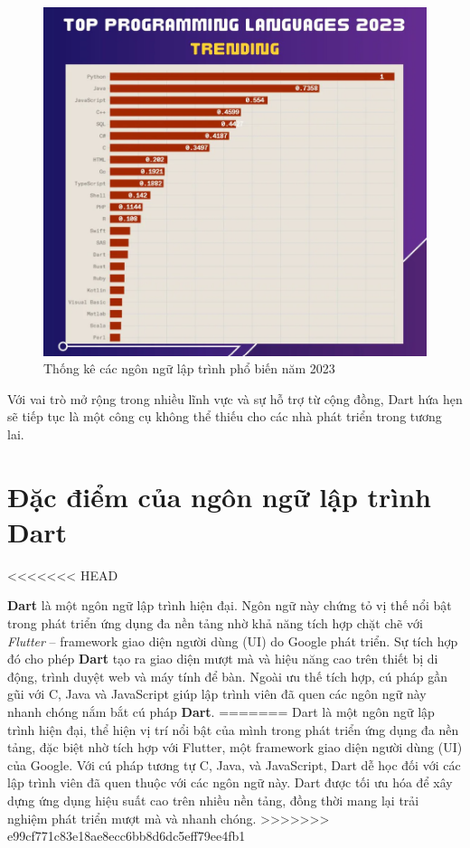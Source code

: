 \documentclass[../DoAn.tex]{subfiles}
\numberwithin{figure}{chapter}
\begin{document}
\begin{figure}[H]
    \centering
    \includegraphics[width=1\textwidth]{Hinhve/ranking.png}
    \caption{Thống kê các ngôn ngữ lập trình phổ biến năm 2023}
    \label{fig:dart_platforms}
\end{figure}

Với vai trò mở rộng trong nhiều lĩnh vực và sự hỗ trợ từ cộng đồng, Dart hứa hẹn sẽ tiếp tục là một công cụ không thể thiếu cho các nhà phát triển trong tương lai.

\section{Đặc điểm của ngôn ngữ lập trình Dart}
<<<<<<< HEAD

\textbf{Dart} là một ngôn ngữ lập trình hiện đại. Ngôn ngữ này chứng tỏ vị thế nổi bật trong phát triển ứng dụng đa nền tảng nhờ khả năng tích hợp chặt chẽ với \emph{Flutter} – framework giao diện người dùng (UI) do Google phát triển. Sự tích hợp đó cho phép \textbf{Dart} tạo ra giao diện mượt mà và hiệu năng cao trên thiết bị di động, trình duyệt web và máy tính để bàn. Ngoài ưu thế tích hợp, cú pháp gần gũi với C, Java và JavaScript giúp lập trình viên đã quen các ngôn ngữ này nhanh chóng nắm bắt cú pháp \textbf{Dart}.
=======
Dart là một ngôn ngữ lập trình hiện đại, thể hiện vị trí nổi bật của mình trong phát triển ứng dụng đa nền tảng, đặc biệt nhờ tích hợp với Flutter, một framework giao diện người dùng (UI) của Google. Với cú pháp tương tự C, Java, và JavaScript, Dart dễ học đối với các lập trình viên đã quen thuộc với các ngôn ngữ này. Dart được tối ưu hóa để xây dựng ứng dụng hiệu suất cao trên nhiều nền tảng, đồng thời mang lại trải nghiệm phát triển mượt mà và nhanh chóng.
>>>>>>> e99cf771c83e18ae8ecc6bb8d6dc5eff79ee4fb1
\end{document}
